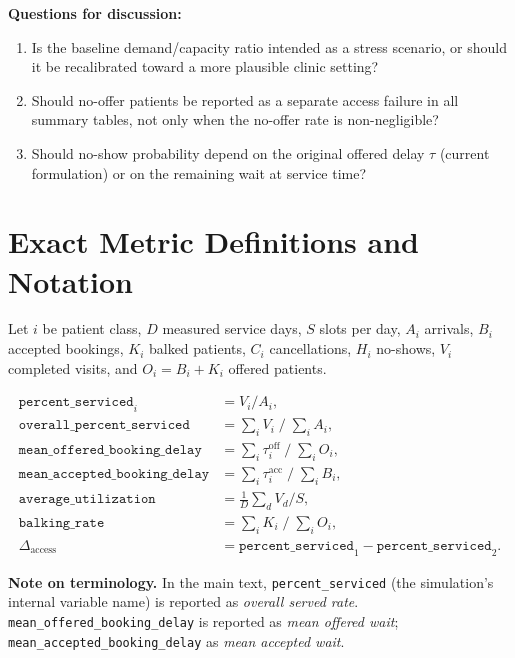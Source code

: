 \documentclass[11pt]{article}
\begin{document}
\bigskip
\noindent\textbf{Questions for discussion:}
\begin{enumerate}[leftmargin=1.5em, itemsep=4pt]
\item Is the baseline demand/capacity ratio intended as a stress scenario,
or should it be recalibrated toward a more plausible clinic setting?
\item Should no-offer patients be reported as a separate access failure
in all summary tables, not only when the no-offer rate is non-negligible?
\item Should no-show probability depend on the original offered delay $\tau$
(current formulation) or on the remaining wait at service time?
\end{enumerate}

\appendix

\section{Exact Metric Definitions and Notation}
\label{app:defs}

Let $i$ be patient class, $D$ measured service days, $S$ slots per day,
$A_i$ arrivals, $B_i$ accepted bookings, $K_i$ balked patients, $C_i$
cancellations, $H_i$ no-shows, $V_i$ completed visits, and
$O_i = B_i + K_i$ offered patients.

\begin{align*}
\texttt{percent\_serviced}_i &= V_i / A_i, \\
\texttt{overall\_percent\_serviced} &= \textstyle\sum_i V_i \;/\; \textstyle\sum_i A_i, \\
\texttt{mean\_offered\_booking\_delay} &= \textstyle\sum_i \tau^{\text{off}}_i \;/\; \textstyle\sum_i O_i, \\
\texttt{mean\_accepted\_booking\_delay} &= \textstyle\sum_i \tau^{\text{acc}}_i \;/\; \textstyle\sum_i B_i, \\
\texttt{average\_utilization} &= \tfrac{1}{D}\textstyle\sum_d V_d / S, \\
\texttt{balking\_rate} &= \textstyle\sum_i K_i \;/\; \textstyle\sum_i O_i, \\
\Delta_{\text{access}} &= \texttt{percent\_serviced}_1 - \texttt{percent\_serviced}_2.
\end{align*}

\noindent\textbf{Note on terminology.} In the main text,
\texttt{percent\_serviced} (the simulation's internal variable name) is
reported as \emph{overall served rate}. \texttt{mean\_offered\_booking\_delay}
is reported as \emph{mean offered wait}; \texttt{mean\_accepted\_booking\_delay}
as \emph{mean accepted wait}.
\end{document}
